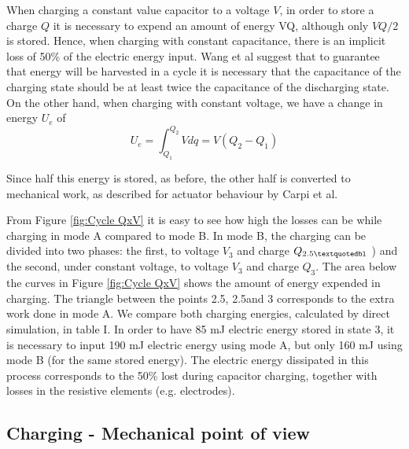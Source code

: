 When charging a constant value capacitor to a voltage $V$, in order to store a charge $Q$ it is necessary to expend an amount of energy VQ, although only $VQ/2$ is stored. Hence, when charging with constant capacitance, there is an implicit loss of 50\% of the electric energy input. Wang et al\cite{RN1} suggest that to guarantee that energy will be harvested in a cycle it is necessary that the capacitance of the charging state should be at least twice the capacitance of the discharging state.
On the other hand, when charging with constant voltage, we have a change in energy $U_e$ of
\begin{equation}
	U_e= \int_{Q_1}^{Q_2}V dq=V(Q_2-Q_1)	
\end{equation}

Since half this energy is stored, as before, the other half is converted to mechanical work, as described for actuator behaviour by Carpi et al\cite{RN43}. 

From Figure \ref{fig:Cycle QxV} it is easy to see how high the losses can be while charging in mode A compared to mode B. In mode B, the charging can be divided into two phases: the first, to voltage $V_3$ and charge $Q_{2.5\textquotedbl}$ ) and the second, under constant voltage, to voltage $V_3$ and charge $Q_3$. The area below the curves in Figure \ref{fig:Cycle QxV} shows the amount of energy expended in charging. The triangle between the points 2.5\textquotesingle, 2.5\textquotedbl and 3 corresponds to the extra work done in mode A.
We compare both charging energies, calculated by direct simulation, in table I. In order to have 85 mJ electric energy stored in state 3, it is necessary to input 190 mJ electric energy using mode A, but only 160 mJ using mode B (for the same stored energy). The electric energy dissipated in this process corresponds to the 50\% lost during capacitor charging, together with losses in the resistive elements (e.g. electrodes).

\subsection{Charging - Mechanical point of view}
\label{subsec:charging}

